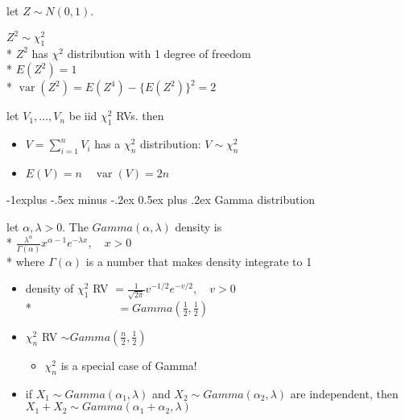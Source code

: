\documentclass[10pt, landscape]{article}
\makeatletter
\renewcommand{\subsection}{\@startsection{subsection}{2}{0mm}%
  {-1explus -.5ex minus -.2ex}%
  {0.5ex plus .2ex}%
{\normalfont\normalsize\bfseries}}
\newcommand{\var}{\mathop{\mathrm{var}}}
\makeatother
\begin{document}
\begin{multicols*}{4}
  let $Z \sim N(0,1)$. 
  \begin{tightcenter}
    $Z^2 \sim \chi^2_1$ \\*
    $Z^2$ has $\chi^2$ distribution with 1 degree of freedom
    \\* $E(Z^2) = 1$
    \\* $\var(Z^2) = E(Z^4) - \{ E(Z^2) \}^2 = 2$
  \end{tightcenter}

  let $V_1, \dots, V_n$ be iid $\chi^2_1$ RVs. then 
  \begin{itemize}
    \item $V = \sum^n_{i=1}V_i$ has a $\chi^2_n$ distribution: $V \sim \chi^2_n$
    \item $E(V) = n \quad \var(V) = 2n$
  \end{itemize}

  \subsection{Gamma distribution}

  \begin{tightcenter}
    let $\alpha, \lambda > 0$. The $Gamma(\alpha, \lambda)$ density is 
    \\* \( {\displaystyle{ \frac{\lambda^\alpha}{\Gamma(\alpha)} x^{\alpha-1} e^{-\lambda x}, \quad x > 0 }} \) 
    \\* where $\Gamma(\alpha)$ is a number that makes density integrate to 1
  \end{tightcenter}

  \begin{itemize}
    \item density of $\chi_1^2$ RV $= \frac{1}{\sqrt{2\pi}} v^{-1/2} e^{-v/2}, \quad v > 0$
      \\* $\quad\quad\quad\quad\quad\quad\quad\; = Gamma(\frac{1}{2}, \frac{1}{2})$
    \item $\chi^2_n$ RV $\sim Gamma(\frac{n}{2}, \frac{1}{2})$
      \begin{itemize}
        \item $\chi^2_n$ is a special case of Gamma!
      \end{itemize}
    \item if $X_1 \sim Gamma(\alpha_1, \lambda)$ and $X_2 \sim Gamma(\alpha_2, \lambda)$ are independent, then $X_1 + X_2 \sim Gamma(\alpha_1 + \alpha_2, \lambda)$
  \end{itemize}






\end{multicols*}
\end{document}

